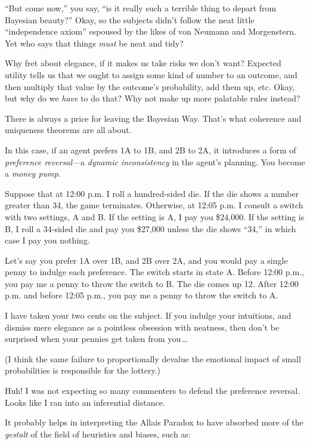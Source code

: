  ``But come now,'' you say,
``is it really such a terrible thing to depart from
Bayesian beauty?'' Okay, so the subjects
didn't follow the neat little
``independence axiom'' espoused by
the likes of von Neumann and Morgenstern. Yet who says that things
\textit{must} be neat and tidy?


 Why fret about elegance, if it makes us take risks we
don't want? Expected utility tells us that we ought to
assign some kind of number to an outcome, and then multiply that value
by the outcome's probability, add them up, etc. Okay,
but why do we \textit{have} to do that? Why not make up more palatable
rules instead?


 There is always a price for leaving the Bayesian Way.
That's what coherence and uniqueness theorems are all
about.


 In this case, if an agent prefers 1A to 1B, and 2B to 2A, it
introduces a form of \textit{preference reversal}{}---a \textit{dynamic
inconsistency} in the agent's planning. You become a
\textit{money pump}.


 Suppose that at 12:00 p.m. I roll a hundred-sided die. If the die
shows a number greater than 34, the game terminates. Otherwise, at
12:05 p.m. I consult a switch with two settings, A and B. If the
setting is A, I pay you \$24,000. If the setting is B, I roll a
34-sided die and pay you \$27,000 unless the die shows
``34,'' in which case I pay you
nothing.


 Let's say you prefer 1A over 1B, and 2B over 2A,
and you would pay a single penny to indulge each preference. The switch
starts in state A. Before 12:00 p.m., you pay me a penny to throw the
switch to B. The die comes up 12. After 12:00 p.m. and before 12:05
p.m., you pay me a penny to throw the switch to A.


 I have taken your two cents on the subject. If you indulge your
intuitions, and dismiss mere elegance as a pointless obsession with
neatness, then don't be surprised when your pennies get
taken from you\,\ldots


 (I think the same failure to proportionally devalue the emotional
impact of small probabilities is responsible for the lottery.)

\myendsectiontext




 Huh! I was not expecting so many commenters to defend the
preference reversal. Looks like I ran into an inferential distance. 


 It probably helps in interpreting the Allais Paradox to have
absorbed more of the \textit{gestalt} of the field of heuristics and
biases, such as:

